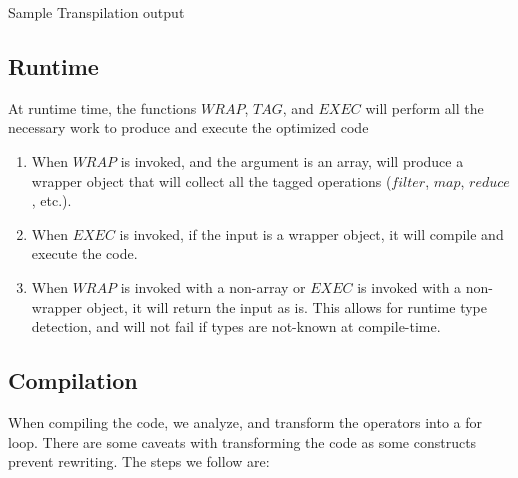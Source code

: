 \documentclass{article}
\begin{document}
  Sample Transpilation output  
  

\subsection{Runtime}
  At runtime time, the functions $WRAP$, $TAG$, and $EXEC$ will perform all the necessary work to produce 
  and execute the optimized code
  \begin{enumerate}
    \item When $WRAP$ is invoked, and the argument is an array, will produce a wrapper object that will collect 
      all the tagged operations ($filter$, $map$, $reduce$, etc.).  
    \item When $EXEC$ is invoked, if the input is a wrapper object, it will compile and execute the code.      
    \item When $WRAP$ is invoked with a non-array or $EXEC$ is invoked with a non-wrapper object, 
      it will return the input as is.  This allows for runtime type detection, and will not fail if 
      types are not-known at compile-time.          
  \end{enumerate}

\subsection{Compilation}
  When compiling the code, we analyze, and transform the operators into a for loop.  There are some
  caveats with transforming the code as some constructs prevent rewriting. The steps we follow are:
\end{document}
